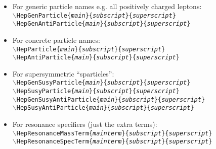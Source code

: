 \documentclass[12pt]{article}
\begin{document}
\begin{itemize}
\item For generic particle names e.g. all positively charged leptons:\\
\texttt{$\backslash{}$HepGenParticle\{\textit{main}\}\{\textit{subscript}\}\{\textit{superscript}\}}\\
\texttt{$\backslash{}$HepGenAntiParticle\{\textit{main}\}\{\textit{subscript}\}\{\textit{superscript}\}}

\item For concrete particle names:\\
\texttt{$\backslash{}$HepParticle\{\textit{main}\}\{\textit{subscript}\}\{\textit{superscript}\}}\\
\texttt{$\backslash{}$HepAntiParticle\{\textit{main}\}\{\textit{subscript}\}\{\textit{superscript}\}}

\item For supersymmetric ``sparticles'':\\
\texttt{$\backslash{}$HepGenSusyParticle\{\textit{main}\}\{\textit{subscript}\}\{\textit{superscript}\}}\\
\texttt{$\backslash{}$HepSusyParticle\{\textit{main}\}\{\textit{subscript}\}\{\textit{superscript}\}}\\
\texttt{$\backslash{}$HepGenSusyAntiParticle\{\textit{main}\}\{\textit{subscript}\}\{\textit{superscript}\}}\\
\texttt{$\backslash{}$HepSusyAntiParticle\{\textit{main}\}\{\textit{subscript}\}\{\textit{superscript}\}}

\item For resonance specifiers (just the extra terms):\\
\texttt{$\backslash{}$HepResonanceMassTerm\{\textit{mainterm}\}\{\textit{subscript}\}\{\textit{superscript}\}}\\
\texttt{$\backslash{}$HepResonanceSpecTerm\{\textit{mainterm}\}\{\textit{subscript}\}\{\textit{superscript}\}}


\end{itemize}
\end{document}
